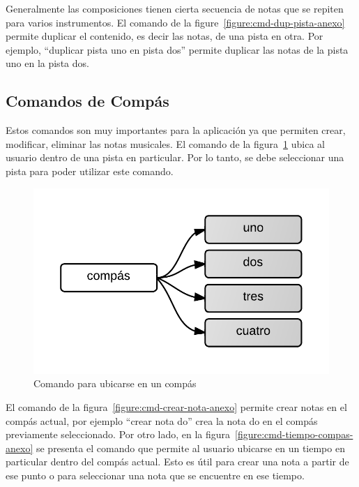 Generalmente las composiciones tienen cierta secuencia de notas que se repiten para varios instrumentos. El comando de la 
figure~\ref{figure:cmd-dup-pista-anexo} permite duplicar el contenido, es decir las notas, de una pista en otra. Por ejemplo, 
``duplicar pista uno en pista dos'' permite duplicar las notas de la pista uno en la pista dos.

\subsection{Comandos de Comp\'as} 

Estos comandos son muy importantes para la aplicaci\'on ya que permiten crear, modificar, 
eliminar las notas musicales. El comando de la figura~\ref{figure:cmd-compas-anexo} ubica al usuario dentro de una pista en particular. 
Por lo tanto, se debe seleccionar una pista para poder utilizar este comando.

\begin{figure}[H]  
\centering
\includegraphics[width=0.4\linewidth]{./graphics/cmd-compas.png}
\caption{Comando para ubicarse en un comp\'as}
\label{figure:cmd-compas-anexo}
\quad
\end{figure}

El comando de la figura~\ref{figure:cmd-crear-nota-anexo} permite crear notas en el  
comp\'as actual, por ejemplo ``crear nota do'' crea la nota do en el comp\'as previamente seleccionado. Por otro lado, en la figura~\ref{figure:cmd-tiempo-compas-anexo} se presenta el comando que permite al usuario ubicarse en un  
tiempo en particular dentro del comp\'as actual. Esto es \'util para crear una nota a partir de ese punto o 
para seleccionar una nota que se encuentre en ese tiempo.

